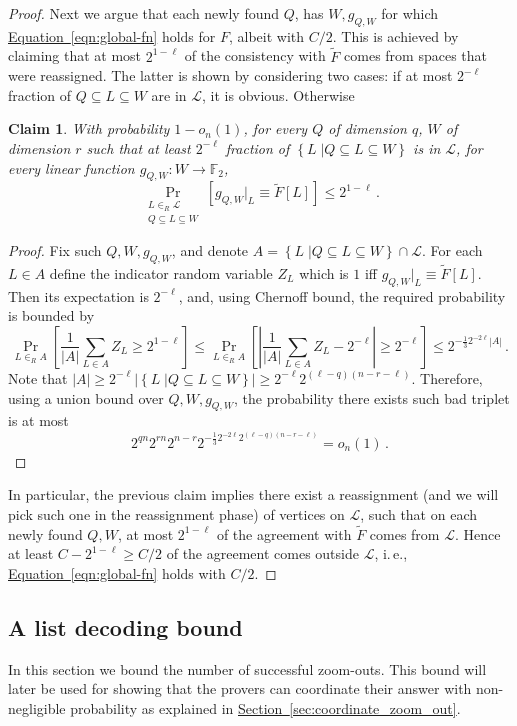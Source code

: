 \documentclass[11pt]{article}
\numberwithin{equation}{section}
\newtheorem{claim}[theorem]{Claim}
\theoremstyle{definition}
\theoremstyle{plain}
\newcommand{\ie}{i.\,e.}
\newcommand{\expref}[2]{\hyperref[#2]{#1~\ref{#2}}}
\newcommand{\expeqref}[2]{\hyperref[#2]{#1~\eqref{#2}}}
\newcommand\card[1]{\left| {#1} \right|}
\newcommand\sett[2]{\left\{ \left. #1 \;\right\vert #2 \right\}}
\newcommand\Prob[2]{{\Pr_{#1}\left[ {#2} \right]}}
\renewcommand\geq{\geqslant}
\renewcommand\leq{\leqslant}
\def\L{\mathcal{L}}
\def\F{\mathbb{F}}
\def\L{\mathcal{L}}
\begin{document}
\begin{proof}
Next we argue that each newly found $Q$, has $W,g_{Q,W}$ for which \expeqref{Equation}{eqn:global-fn} holds for $F$,
albeit with $C/2$.
This is achieved by claiming that at most $2^{1-\ell}$ of the consistency with $\tilde{F}$ comes from spaces that were reassigned.
The latter is shown by considering two cases:
if at most $2^{-\ell}$ fraction of $Q\subseteq L\subseteq W$ are in $\L$, it is obvious. Otherwise
%
\begin{claim}
With probability $1-o_n(1)$, for every $Q$ of dimension $q$, $W$ of dimension $r$ such that at least $2^{-\ell}$ fraction of
$\sett{L}{Q\subseteq L\subseteq W}$ is in $\L$, for every linear function $g_{Q,W}\colon W\to\F_2$,
\[
\Prob{\substack{L\in_R \L \\ Q\subseteq L\subseteq W}}{g_{Q,W}|_L \equiv \tilde{F}[L]}\leq 2^{1-\ell}\,.
\]
\end{claim}
\begin{proof}
Fix such $Q,W,g_{Q,W}$, and denote $A = \sett{L}{Q\subseteq L\subseteq W}\cap \L$. For each $L\in A$ define the indicator
random variable $Z_L$ which is $1$ iff $g_{Q,W}|_L \equiv \tilde{F}[L]$. Then its expectation is $2^{-\ell}$, and, using Chernoff bound, the required
probability is bounded by
\[
\Prob{L\in_R A}{\frac{1}{\card{A}}\sum\limits_{L\in A}{Z_L}\geq 2^{1-\ell}}\leq
\Prob{L\in_R A}{\card{\frac{1}{\card{A}}\sum\limits_{L\in A}{Z_L}-2^{-\ell}}\geq 2^{-\ell}}\leq
2^{-\frac{1}{3}2^{-2\ell}\card{A}}\,.
\]
Note that $\card{A}\geq 2^{-\ell}\card{\sett{L}{Q\subseteq L\subseteq W}}\geq 2^{-\ell} 2^{(\ell-q)(n-r-\ell)}$.
Therefore, using a union bound over $Q,W,g_{Q,W}$, the probability there exists such bad triplet is at most
\[
2^{qn}2^{rn}2^{n-r}2^{-\frac{1}{3}2^{-2\ell}2^{(\ell-q)(n-r-\ell)}} = o_n(1)\,.
\]
\end{proof}

In particular, the previous claim implies there exist a reassignment (and we will pick such one
in the reassignment phase) of vertices on $\L$, such that on each newly found
$Q,W$, at most $2^{1-\ell}$ of the agreement with $\tilde{F}$ comes from $\L$. Hence at least $C-2^{1-\ell}\geq C/2$ of
the agreement comes outside $\L$, \ie, \expeqref{Equation}{eqn:global-fn} holds with $C/2$.
\end{proof}




\subsection{A list decoding bound}
In this section we bound the number of successful zoom-outs. This
bound will later be used for showing that the provers can coordinate
their answer with non-negligible probability as explained in \expref{Section}{sec:coordinate_zoom_out}.
\end{document}

